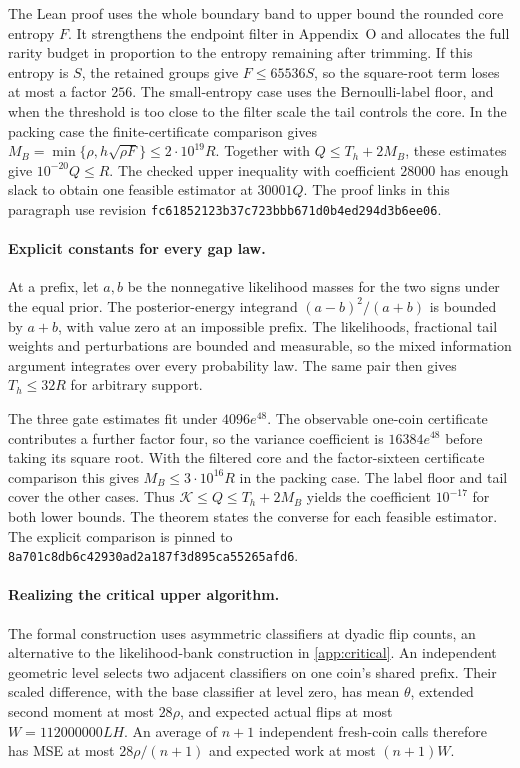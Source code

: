 The Lean proof uses the whole boundary band to upper bound the rounded
core entropy $F$. It strengthens the endpoint filter in Appendix~O
and allocates the full rarity budget in proportion to the entropy
remaining after trimming. If this entropy is $S$, the retained groups
give $F\le65536S$, so the square-root term loses at most a factor $256$.
The small-entropy case uses the Bernoulli-label floor, and when the
threshold is too close to the filter scale the tail controls the core.
In the packing case the finite-certificate comparison gives
$M_B=\min\{\rho,h\sqrt{\rho F}\}\le2\cdot10^{19}R$.
Together with $Q\le T_h+2M_B$, these estimates give $10^{-20}Q\le R$.
The checked upper inequality with coefficient $28000$ has enough slack
to obtain one feasible estimator at $30001Q$. The proof links in this
paragraph use revision \nolinkurl{fc61852123b37c723bbb671d0b4ed294d3b6ee06}.

\paragraph{Explicit constants for every gap law.}
At a prefix, let $a,b$ be the nonnegative likelihood masses for the two signs
under the equal prior. The posterior-energy integrand
$(a-b)^2/(a+b)$ is bounded by $a+b$, with value zero at an impossible
prefix. The likelihoods, fractional tail weights and perturbations are
bounded and measurable, so the mixed information argument integrates over
every probability law. The same pair then gives $T_h\le32R$ for arbitrary
support.

The three gate estimates fit under $4096e^{48}$.
The observable one-coin certificate contributes a further factor four,
so the variance coefficient is $16384e^{48}$ before taking its square
root. With the filtered core and the factor-sixteen certificate comparison
this gives $M_B\le3\cdot10^{16}R$ in the packing case. The label floor and
tail cover the other cases. Thus $\mathcal K\le Q\le T_h+2M_B$ yields
the coefficient $10^{-17}$ for both lower bounds. The
 theorem states
the converse for each feasible estimator. The explicit comparison is
pinned to \nolinkurl{8a701c8db6c42930ad2a187f3d895ca55265afd6}.

\paragraph{Realizing the critical upper algorithm.}
The formal construction uses asymmetric classifiers at dyadic flip counts,
an alternative to the likelihood-bank construction in \cref{app:critical}.
An independent geometric level selects two adjacent classifiers on one
coin's shared prefix. Their scaled difference, with the base classifier
at level zero, has mean $\theta$, extended second moment at most $28\rho$,
and expected actual flips at most $W=112000000LH$.
An average of $n+1$ independent fresh-coin calls therefore has MSE at most
$28\rho/(n+1)$ and expected work at most $(n+1)W$.


